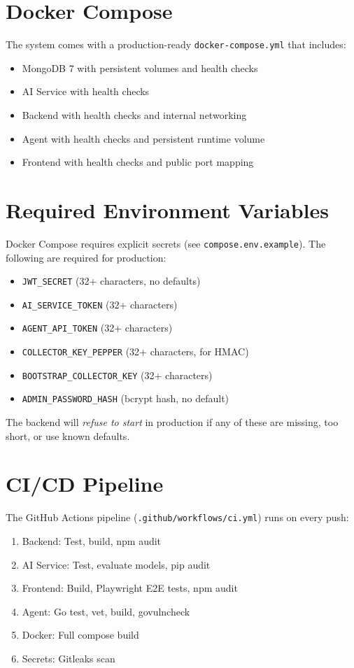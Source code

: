 \documentclass[12pt,a4paper,twoside]{report}
\begin{document}
\section{Docker Compose}
The system comes with a production-ready \texttt{docker-compose.yml} that includes:
\begin{itemize}[noitemsep]
    \item MongoDB 7 with persistent volumes and health checks
    \item AI Service with health checks
    \item Backend with health checks and internal networking
    \item Agent with health checks and persistent runtime volume
    \item Frontend with health checks and public port mapping
\end{itemize}

\section{Required Environment Variables}
Docker Compose requires explicit secrets (see \texttt{compose.env.example}). The following are required for production:
\begin{itemize}[noitemsep]
    \item \texttt{JWT\_SECRET} (32+ characters, no defaults)
    \item \texttt{AI\_SERVICE\_TOKEN} (32+ characters)
    \item \texttt{AGENT\_API\_TOKEN} (32+ characters)
    \item \texttt{COLLECTOR\_KEY\_PEPPER} (32+ characters, for HMAC)
    \item \texttt{BOOTSTRAP\_COLLECTOR\_KEY} (32+ characters)
    \item \texttt{ADMIN\_PASSWORD\_HASH} (bcrypt hash, no default)
\end{itemize}

The backend will \textit{refuse to start} in production if any of these are missing, too short, or use known defaults.

\section{CI/CD Pipeline}
The GitHub Actions pipeline (\texttt{.github/workflows/ci.yml}) runs on every push:
\begin{enumerate}[noitemsep]
    \item Backend: Test, build, npm audit
    \item AI Service: Test, evaluate models, pip audit
    \item Frontend: Build, Playwright E2E tests, npm audit
    \item Agent: Go test, vet, build, govulncheck
    \item Docker: Full compose build
    \item Secrets: Gitleaks scan
\end{enumerate}
\end{document}
